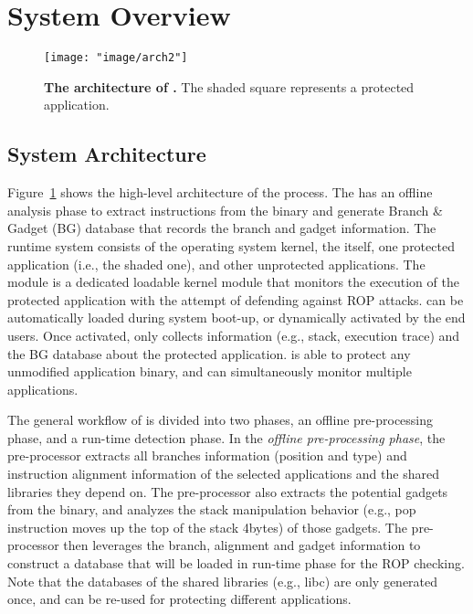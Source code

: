 \section{System Overview} \label{sec:overview}
\begin{figure}
 \centering
\texttt{[image: "image/arch2"]}
\caption{\textbf{The architecture of \name.} The shaded square represents a protected application.}\label{fig:arch}
\end{figure}
\subsection{System Architecture}\label{sec:phases}

Figure~\ref{fig:arch} shows the high-level architecture of the \name process.
The \name has an offline analysis phase to extract instructions from the binary and generate Branch \& Gadget (BG) database that records the branch and gadget information.%
The runtime system consists of the operating system kernel, the \name itself, one protected application (i.e., the shaded one), and other unprotected applications.
The \name module is a dedicated loadable kernel module that monitors the execution of the protected application with the attempt of defending against ROP attacks.
\name can be automatically loaded during system boot-up, or dynamically activated by the end users.
Once activated, \name only collects information (e.g., stack, execution trace) and the BG database about the protected application.
\name is able to protect any unmodified application binary, and can simultaneously monitor multiple applications.

The general workflow of \name is divided into two phases,
an offline pre-processing phase, and a run-time detection phase.
In the {\em offline pre-processing phase}, the \name pre-processor extracts all
branches information (position and type) and instruction alignment information
of the selected applications and the shared libraries they depend on.
The \name pre-processor also extracts the potential gadgets from the binary,
and analyzes the stack manipulation behavior (e.g., pop instruction moves up the top of the stack 4bytes) of those gadgets.
The pre-processor then leverages the branch, alignment and gadget information
to construct a database that will be loaded in run-time phase for the ROP checking.
Note that the databases of the shared libraries (e.g., libc) are only
generated once, and can be re-used for protecting different applications.

